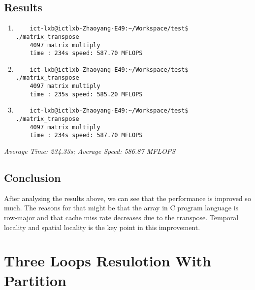 \documentclass[a4paper, 11pt]{article}
\begin{document}
\subsection{Results}
\begin{enumerate}
    \item
\begin{verbatim}
    ict-lxb@ictlxb-Zhaoyang-E49:~/Workspace/test$ ./matrix_transpose 
    4097 matrix multiply
    time : 234s speed: 587.70 MFLOPS
\end{verbatim}
    \item
\begin{verbatim}
    ict-lxb@ictlxb-Zhaoyang-E49:~/Workspace/test$ ./matrix_transpose 
    4097 matrix multiply
    time : 235s speed: 585.20 MFLOPS
\end{verbatim}
    \item
\begin{verbatim}
    ict-lxb@ictlxb-Zhaoyang-E49:~/Workspace/test$ ./matrix_transpose 
    4097 matrix multiply
    time : 234s speed: 587.70 MFLOPS
\end{verbatim}
\end{enumerate}

\emph{Average Time: 234.33s; Average Speed: 586.87 MFLOPS}

\subsection{Conclusion}
After analysing the results above, we can see that the performance is improved
so much. The reasons for that might be that the array in C program language is
row-major and that cache miss rate decreases due to the transpose. Temporal
locality and spatial locality is the key point in this improvement.

\section{Three Loops Resulotion With Partition}
\end{document}
